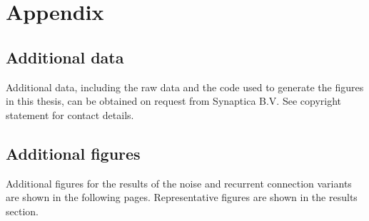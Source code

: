 \chapter{Appendix}\label{ch:appendix_c}

\section{Additional data}
Additional data, including the raw data and the code used to generate the figures in this thesis, can be obtained on request from
Synaptica B.V. See copyright statement for contact details.

\section{Additional figures}
Additional figures for the results of the noise and recurrent connection variants are shown in the following pages.
Representative figures are shown in the results section.
\pagebreak

